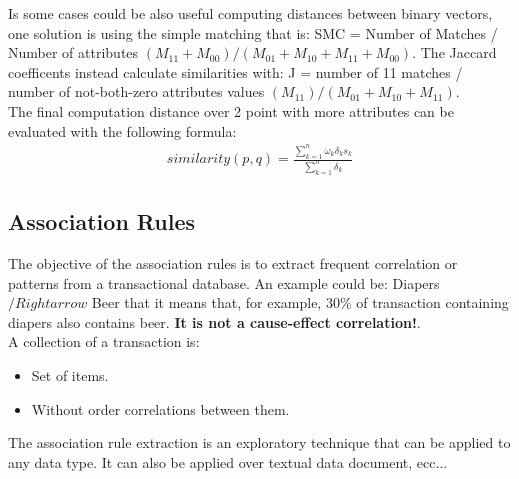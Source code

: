 \documentclass[12pt]{article}
\begin{document}
Is some cases could be also useful computing distances between binary vectors, one solution is using the simple matching that is: SMC = Number of Matches / Number of attributes $(M_11 + M_00) / (M_01 + M_10 + M_11 + M_00)$. The Jaccard coefficents instead calculate similarities with: J = number of 11 matches / number of not-both-zero attributes values $(M_11) / (M_01 + M_10 + M_11)$.\\
The final computation distance over 2 point with more attributes can be evaluated with the following formula:
\begin{equation}
  \begin{gathered}
    similarity(p,q) = \frac{\sum_{k=1}^{n} \omega_k \delta_k s_k}{\sum_{k=1}^{n} \delta_k}
  \end{gathered}
\end{equation}

\subsection{Association Rules}
The objective of the association rules is to extract frequent correlation or patterns from a transactional database. An example could be:
Diapers $/Rightarrow$ Beer that it means that, for example, 30\% of transaction containing diapers also contains beer. \textbf{It is not a cause-effect correlation!}.\\
A collection of a transaction is:
\begin{itemize}
  \item Set of items.
  \item Without order correlations between them.
\end{itemize}
The association rule extraction is an exploratory technique that can be applied to any data type. It can also be applied over textual data document, ecc...\\
\end{document}
